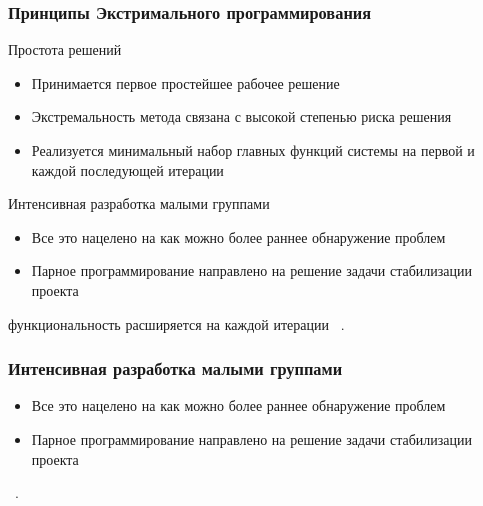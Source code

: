 \documentclass{../industrial-development}
\begin{document}
\begin{frame} \frametitle{Принципы Экстримального программирования} 
Простота решений
\begin{itemize}
	\item Принимается первое простейшее рабочее решение
	\item Экстремальность метода связана с высокой степенью риска решения
	\item Реализуется минимальный набор главных функций системы на первой и каждой последующей итерации
\end{itemize}	

Интенсивная разработка малыми группами
\begin{itemize}
	\item Все это нацелено на как можно более раннее обнаружение проблем
	\item Парное программирование направлено на решение задачи стабилизации проекта
\end{itemize}	
\end{frame}

\lecturenotes
функциональность расширяется на каждой итерации
~\cite{Fowler}.


\begin{frame} \frametitle{Интенсивная разработка малыми группами}
\begin{itemize}
\item Все это нацелено на как можно более раннее обнаружение проблем
\item Парное программирование направлено на решение задачи стабилизации проекта
	\end{itemize}	
\end{frame}

\lecturenotes
~\cite{Fowler}.
\end{document}
